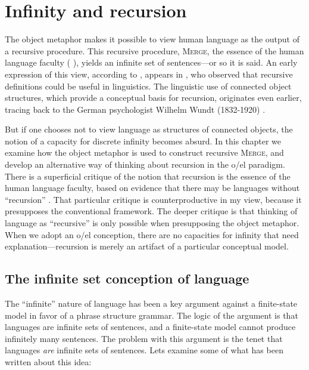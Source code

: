 \chapter{Infinity and recursion}

The object metaphor makes it possible to view human language as the output of a recursive procedure. This recursive procedure, \textsc{Merge}, the essence of the human language faculty (\citeauthor{Chomsky2001b} \citeyear*{Chomsky2001b,Chomsky2008}), yields an infinite set of sentences—or so it is said. An early expression of this view, according to \citet{Tomalin2007}, appears in \citet{Bar-Hillel1953}, who observed that recursive definitions could be useful in linguistics. The linguistic use of connected object structures, which provide a conceptual basis for recursion, originates even earlier, tracing back to the German psychologist Wilhelm Wundt (1832-1920) \citep{Seuren1998}.

  But if one chooses not to view language as structures of connected objects, the notion of a capacity for discrete infinity becomes absurd. In this chapter we examine how the object metaphor is used to construct recursive \textsc{Merge}, and develop an alternative way of thinking about recursion in the o/el paradigm. There is a superficial critique of the notion that recursion is the essence of the human language faculty, based on evidence that there may be languages without “recursion” \citep{Everett2005}. That particular critique is counterproductive in my view, because it presupposes the conventional framework. The deeper critique is that thinking of language as “recursive” is only possible when presupposing the object metaphor. When we adopt an o/el conception, there are no capacities for infinity that need explanation—recursion is merely an artifact of a particular conceptual model.

\section{The infinite set conception of language}

The “infinite” nature of language has been a key argument against a finite-state model in favor of a phrase structure grammar. The logic of the argument is that languages are infinite sets of sentences, and a finite-state model cannot produce infinitely many sentences. The problem with this argument is the tenet that languages \textit{are} infinite sets of sentences. Lets examine some of what has been written about this idea:  

